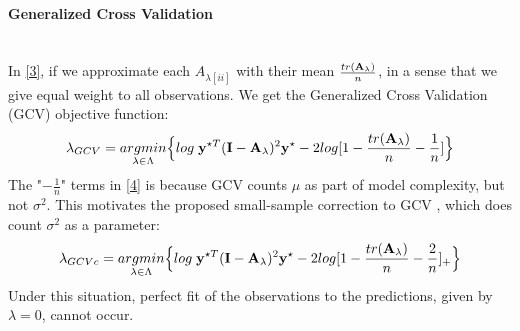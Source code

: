 \documentclass[11pt]{article}
\begin{document}
\paragraph{Generalized Cross Validation}\mbox{}\\
In \eqref{3}, if we approximate each $A_{\lambda[ii]}$ with their mean $\frac{tr({\bf A}_\lambda)}{n}$, in a sense that we give equal weight to all observations. We get the Generalized Cross Validation (GCV) objective function:
\begin{align}
\lambda_{GCV}=\underset{\lambda \in \Lambda}{argmin}\Big\{log\; {\bf y}^{\star T}({\bf I}-{\bf A}_\lambda)^2{\bf y}^\star-2log[1-\frac{tr({\bf A}_\lambda)}{n}-\frac{1}{n}]\Big\} \label{4}
\end{align}
The "$-\frac{1}{n}$" terms in \eqref{4} is because GCV counts $\mu$ as part of model complexity, but not $\sigma^2$. This motivates the proposed small-sample correction to GCV \citep{boonstra_small-sample_2015}, which does count $\sigma^2$ as a parameter:
\begin{align}
\lambda_{GCVc}=\underset{\lambda \in \Lambda}{argmin}\Big\{log\; {\bf y}^{\star T}({\bf I}-{\bf A}_\lambda)^2{\bf y}^\star-2log[1-\frac{tr({\bf A}_\lambda)}{n}-\frac{2}{n}]_+\Big\}
\end{align}
Under this situation, perfect fit of the observations to the predictions, given by $\lambda=0$, cannot occur.
\end{document}
